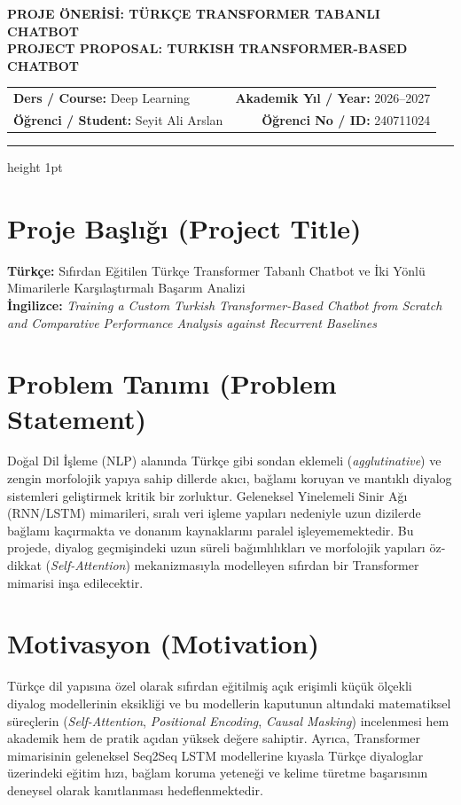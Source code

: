 \documentclass[11pt,a4paper]{article}
\begin{document}
\begin{center}
    {\Large\bfseries PROJE ÖNERİSİ: TÜRKÇE TRANSFORMER TABANLI CHATBOT}\\[0.25cm]
    {\normalsize\textbf{PROJECT PROPOSAL: TURKISH TRANSFORMER-BASED CHATBOT}}\\[0.4cm]
    
    \begin{tabularx}{\textwidth}{Xr}
        \textbf{Ders / Course:} Deep Learning & \textbf{Akademik Yıl / Year:} 2026--2027 \\
        \textbf{Öğrenci / Student:} Seyit Ali Arslan & \textbf{Öğrenci No / ID:} 240711024 \\
    \end{tabularx}
    \vspace{0.2cm}
    \hrule height 1pt
\end{center}
\vspace{0.3cm}

\section{Proje Başlığı (Project Title)}
\textbf{Türkçe:} Sıfırdan Eğitilen Türkçe Transformer Tabanlı Chatbot ve İki Yönlü Mimarilerle Karşılaştırmalı Başarım Analizi \\
\textbf{İngilizce:} \textit{Training a Custom Turkish Transformer-Based Chatbot from Scratch and Comparative Performance Analysis against Recurrent Baselines}

\section{Problem Tanımı (Problem Statement)}
Doğal Dil İşleme (NLP) alanında Türkçe gibi sondan eklemeli (\textit{agglutinative}) ve zengin morfolojik yapıya sahip dillerde akıcı, bağlamı koruyan ve mantıklı diyalog sistemleri geliştirmek kritik bir zorluktur. Geleneksel Yinelemeli Sinir Ağı (RNN/LSTM) mimarileri, sıralı veri işleme yapıları nedeniyle uzun dizilerde bağlamı kaçırmakta ve donanım kaynaklarını paralel işleyememektedir. Bu projede, diyalog geçmişindeki uzun süreli bağımlılıkları ve morfolojik yapıları öz-dikkat (\textit{Self-Attention}) mekanizmasıyla modelleyen sıfırdan bir Transformer mimarisi inşa edilecektir.

\section{Motivasyon (Motivation)}
Türkçe dil yapısına özel olarak sıfırdan eğitilmiş açık erişimli küçük ölçekli diyalog modellerinin eksikliği ve bu modellerin kaputunun altındaki matematiksel süreçlerin (\textit{Self-Attention}, \textit{Positional Encoding}, \textit{Causal Masking}) incelenmesi hem akademik hem de pratik açıdan yüksek değere sahiptir. Ayrıca, Transformer mimarisinin geleneksel Seq2Seq LSTM modellerine kıyasla Türkçe diyaloglar üzerindeki eğitim hızı, bağlam koruma yeteneği ve kelime türetme başarısının deneysel olarak kanıtlanması hedeflenmektedir.
\end{document}
